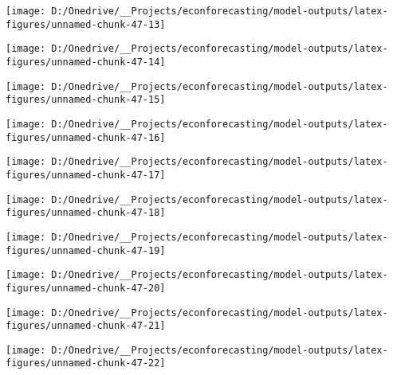 \documentclass[11pt, letterpaper]{article}\usepackage[]{graphicx}\usepackage[]{color}
\begin{document}
{\centering \texttt{[image: D:/Onedrive/\_\_Projects/econforecasting/model-outputs/latex-figures/unnamed-chunk-47-13]} 

}




{\centering \texttt{[image: D:/Onedrive/\_\_Projects/econforecasting/model-outputs/latex-figures/unnamed-chunk-47-14]} 

}




{\centering \texttt{[image: D:/Onedrive/\_\_Projects/econforecasting/model-outputs/latex-figures/unnamed-chunk-47-15]} 

}




{\centering \texttt{[image: D:/Onedrive/\_\_Projects/econforecasting/model-outputs/latex-figures/unnamed-chunk-47-16]} 

}




{\centering \texttt{[image: D:/Onedrive/\_\_Projects/econforecasting/model-outputs/latex-figures/unnamed-chunk-47-17]} 

}




{\centering \texttt{[image: D:/Onedrive/\_\_Projects/econforecasting/model-outputs/latex-figures/unnamed-chunk-47-18]} 

}




{\centering \texttt{[image: D:/Onedrive/\_\_Projects/econforecasting/model-outputs/latex-figures/unnamed-chunk-47-19]} 

}




{\centering \texttt{[image: D:/Onedrive/\_\_Projects/econforecasting/model-outputs/latex-figures/unnamed-chunk-47-20]} 

}




{\centering \texttt{[image: D:/Onedrive/\_\_Projects/econforecasting/model-outputs/latex-figures/unnamed-chunk-47-21]} 

}




{\centering \texttt{[image: D:/Onedrive/\_\_Projects/econforecasting/model-outputs/latex-figures/unnamed-chunk-47-22]} 

}
\end{document}
